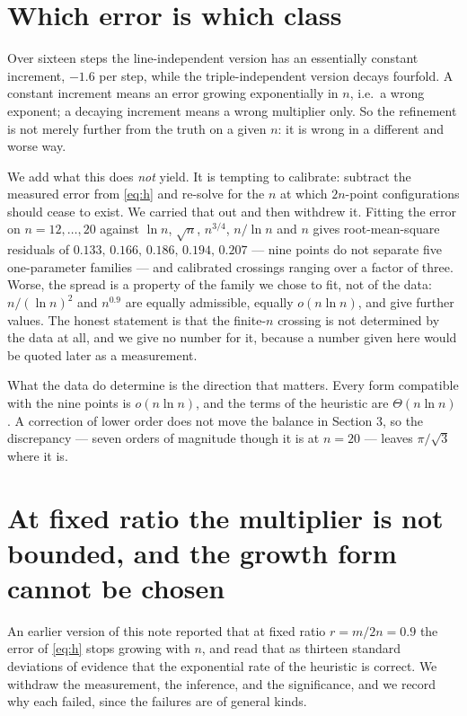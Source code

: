 \documentclass[11pt,a4paper]{article}
\begin{document}
\section{Which error is which class}
Over sixteen steps the line-independent version has an essentially constant increment,
$-1.6$ per step, while the triple-independent version decays fourfold.  A constant increment means
an error growing exponentially in $n$, i.e.\ a wrong exponent; a decaying increment means a wrong
multiplier only.  So the refinement is not merely further from the truth on a given $n$: it is
wrong in a different and worse way.

We add what this does \emph{not} yield.  It is tempting to calibrate: subtract the measured error
from \eqref{eq:h} and re-solve for the $n$ at which $2n$-point configurations should cease to
exist.  We carried that out and then withdrew it.  Fitting the error on $n=12,\dots,20$ against
$\ln n$, $\sqrt n$, $n^{3/4}$, $n/\ln n$ and $n$ gives root-mean-square residuals of
$0.133,\,0.166,\,0.186,\,0.194,\,0.207$ --- nine points do not separate five one-parameter
families --- and calibrated crossings ranging over a factor of three.  Worse, the spread is a
property of the family we chose to fit, not of the data: $n/(\ln n)^2$ and $n^{0.9}$ are equally
admissible, equally $o(n\ln n)$, and give further values.  The honest statement is that the
finite-$n$ crossing is not determined by the data at all, and we give no number for it, because a
number given here would be quoted later as a measurement.

What the data do determine is the direction that matters.  Every form compatible with the nine
points is $o(n\ln n)$, and the terms of the heuristic are $\Theta(n\ln n)$.  A correction of lower
order does not move the balance in Section 3, so the discrepancy --- seven orders of magnitude
though it is at $n=20$ --- leaves $\pi/\sqrt3$ where it is.


\section{At fixed ratio the multiplier is not bounded, and the growth form cannot be chosen}
An earlier version of this note reported that at fixed ratio $r=m/2n=0.9$ the error of
\eqref{eq:h} stops growing with $n$, and read that as thirteen standard deviations of evidence
that the exponential rate of the heuristic is correct.  We withdraw the measurement, the
inference, and the significance, and we record why each failed, since the failures are of
general kinds.
\end{document}
